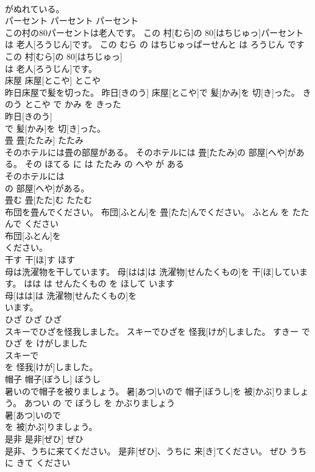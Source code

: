 \documentclass[8pt]{extreport}
\begin{document}
\begin{CJK}{UTF8}{min}
\\	がぬれている。			
\\	パーセント	パーセント	パーセント	
\\	この村の80パーセントは老人です。	この 村[むら]の 80[はちじゅっ]パーセントは 老人[ろうじん]です。	この むら の はちじゅっぱーせんと は ろうじん です	
\\	この 村[むら]の 80[はちじゅっ]
\\	は 老人[ろうじん]です。			
\\	床屋	床屋[とこや]	とこや	
\\	昨日床屋で髪を切った。	昨日[きのう] 床屋[とこや]で 髪[かみ]を 切[き]った。	きのう とこや で かみ を きった	
\\	昨日[きのう]
\\	で 髪[かみ]を 切[き]った。			
\\	畳	畳[たたみ]	たたみ	
\\	そのホテルには畳の部屋がある。	そのホテルには 畳[たたみ]の 部屋[へや]がある。	その ほてる に は たたみ の へや が ある	
\\	そのホテルには
\\	の 部屋[へや]がある。			
\\	畳む	畳[たた]む	たたむ	
\\	布団を畳んでください。	布団[ふとん]を 畳[たた]んでください。	ふとん を たたんで ください	
\\	布団[ふとん]を
\\	ください。			
\\	干す	干[ほ]す	ほす	
\\	母は洗濯物を干しています。	母[はは]は 洗濯物[せんたくもの]を 干[ほ]しています。	はは は せんたくもの を ほして います	
\\	母[はは]は 洗濯物[せんたくもの]を
\\	います。			
\\	ひざ	ひざ	ひざ	
\\	スキーでひざを怪我しました。	スキーでひざを 怪我[けが]しました。	すきー で ひざ を けがしました	
\\	スキーで
\\	を 怪我[けが]しました。			
\\	帽子	帽子[ぼうし]	ぼうし	
\\	暑いので帽子を被りましょう。	暑[あつ]いので 帽子[ぼうし]を 被[かぶ]りましょう。	あつい の で ぼうし を かぶりましょう	
\\	暑[あつ]いので
\\	を 被[かぶ]りましょう。			
\\	是非	是非[ぜひ]	ぜひ	
\\	是非、うちに来てください。	是非[ぜひ]、うちに 来[き]てください。	ぜひ うち に きて ください	

\end{CJK}
\end{document}
